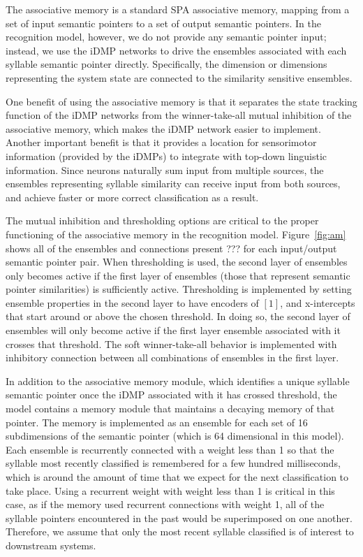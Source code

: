 The associative memory is a standard
SPA associative memory,
mapping from a set of input semantic pointers
to a set of output semantic pointers.
In the recognition model, however,
we do not provide any semantic pointer input;
instead, we use the iDMP networks
to drive the ensembles associated
with each syllable semantic pointer directly.
Specifically, the dimension or dimensions
representing the system state
are connected to the similarity sensitive ensembles.

One benefit of using the associative memory
is that it separates the state tracking function
of the iDMP networks
from the winner-take-all mutual inhibition
of the associative memory,
which makes the iDMP network easier to implement.
Another important benefit is that
it provides a location for
sensorimotor information
(provided by the iDMPs)
to integrate with top-down
linguistic information.
Since neurons naturally sum
input from multiple sources,
the ensembles representing syllable similarity
can receive input from both sources,
and achieve faster or more correct classification
as a result.


The mutual inhibition and thresholding options
are critical to the proper functioning
of the associative memory
in the recognition model.
Figure~\ref{fig:am} shows all of the
ensembles and connections present
??? for each input/output semantic pointer pair.
When thresholding is used,
the second layer of ensembles
only becomes active if
the first layer of ensembles
(those that represent semantic pointer similarities)
is sufficiently active.
Thresholding is implemented by
setting ensemble properties in the second layer
to have encoders of $[1]$,
and x-intercepts that start around or above
the chosen threshold.
In doing so, the second layer of ensembles
will only become active if the
first layer ensemble associated with it
crosses that threshold.
The soft winner-take-all behavior
is implemented with inhibitory connection
between all combinations of ensembles
in the first layer.

In addition to the associative memory module,
which identifies a unique syllable semantic pointer
once the iDMP associated with it has crossed threshold,
the model contains a memory module
that maintains a decaying memory
of that pointer.
The memory is implemented as an ensemble
for each set of 16 subdimensions
of the semantic pointer
(which is 64 dimensional in this model).
Each ensemble is recurrently connected
with a weight less than 1
so that the syllable most recently classified
is remembered for a few hundred milliseconds,
which is around the amount of time that we expect
for the next classification to take place.
Using a recurrent weight
with weight less than 1
is critical in this case,
as if the memory used recurrent connections
with weight 1,
all of the syllable pointers
encountered in the past would be
superimposed on one another.
Therefore, we assume that
only the most recent syllable classified
is of interest to downstream systems.

